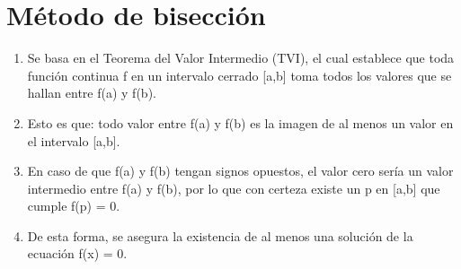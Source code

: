 \section{Método de bisección}
\begin{enumerate}
 \item
   Se basa en el Teorema del Valor Intermedio (TVI), el cual establece que toda función continua f en un intervalo cerrado [a,b] toma todos los valores que se hallan entre f(a) y f(b). 
 \item
   Esto es que: todo valor entre f(a) y f(b) es la imagen de al menos un valor en el intervalo [a,b]. 
 \item
   En caso de que f(a) y f(b) tengan signos opuestos, el valor cero sería un valor intermedio entre f(a) y f(b), por lo que con certeza existe un p en [a,b] que cumple f(p) = 0. 
 \item
   De esta forma, se asegura la existencia de al menos una solución de la ecuación f(x) = 0.
\end{enumerate}
